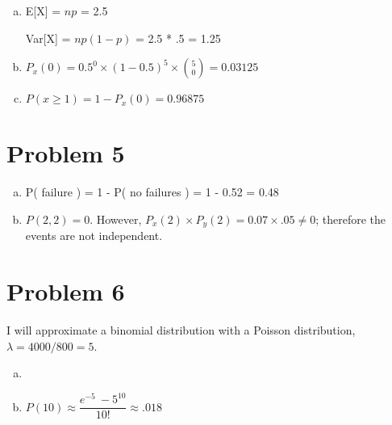 \documentclass[11pt]{article}
\begin{document}
\begin{enumerate}[(a)]
	\item E[X] = $np$ = 2.5
	
			Var[X] = $np(1-p)$ = 2.5 * .5 = 1.25
	\item $P_x(0) = 0.5^0 \times (1-0.5)^5 \times \binom{5}{0}	 = 0.03125$
	
	\item $P( x \geq 1  ) = 1 - P_x(0) = 0.96875$
	
\end{enumerate}

\section*{Problem 5}

\begin{enumerate}[(a)]
	\item P( failure ) = 1 - P( no failures ) = 1 - 0.52 = 0.48
	\item $P(2, 2) = 0$. However, $P_x(2) \times P_y(2) = 0.07 \times .05 \neq 0$; therefore the events are not independent.
\end{enumerate}


\section*{Problem 6}
I will approximate a binomial distribution with a Poisson distribution, $\lambda = 4000/800 = 5$.

\begin{enumerate}[(a)]
	\item 
	\item $P(10) \approx \dfrac{e^{-5}\ -5^{10}}{10!} \approx .018$
\end{enumerate}
\end{document}
